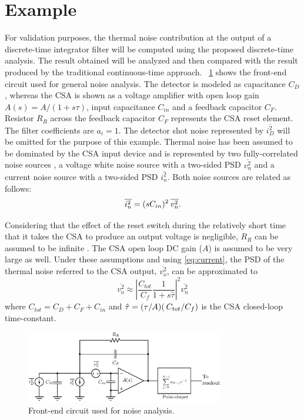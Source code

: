\section{Example}
For validation purposes, the thermal noise contribution at the output of a \mbox{discrete-time} integrator filter will be computed using the proposed \mbox{discrete-time} analysis. The result obtained will be analyzed and then compared with the result produced by the traditional \mbox{continuous-time} approach. \figurename~\ref{fig:analysis-circuit} shows the front-end circuit used for general noise analysis. The detector is modeled as capacitance $C_D$, whereas the CSA is shown as a voltage amplifier with open loop gain $A(s) = A/(1+s\tau)$, input capacitance $C_{in}$ and a feedback capacitor $C_F$. Resistor $R_R$ across the feedback capacitor $C_F$ represents the CSA reset element. The filter coefficients are $a_i=1$. The detector shot noise represented by $\overline{i^2_D}$ will be omitted for the purpose of this example. Thermal noise has been assumed to be dominated by the CSA input device and is represented by two \mbox{fully-correlated} noise sources \citep{sansen101}, a voltage white noise source with a \mbox{two-sided} PSD $\overline{v_n^2}$ and a current noise source with a \mbox{two-sided} PSD $\overline{i_n^2}$. Both noise sources are related as follows:
\begin{equation} 
\overline{i_n^2} = (sC_{in})^2 \hspace{0.2em}\overline{v_n^2}\label{eq:current}.
\end{equation}

Considering that the effect of the reset switch during the relatively short time that it takes the CSA to produce an output voltage is negligible, $R_R$ can be assumed to be infinite \citep{pullia102}. The CSA open loop DC gain ($A$) is assumed to be very large as well. Under these assumptions and using \eqref{eq:current}, the PSD of the thermal noise referred to the CSA output, $\overline{v_o^2}$, can be approximated to
\begin{equation} 
	\overline{v_o^2} \approx \left|\frac{C_{tot}}{C_f} \frac{1}{1+s\hat{\tau}}\right|^2\overline{v_n^2} \label{eq:ex-PSD}
\end{equation}
where $C_{tot} = C_D+C_F+C_{in}$ and $\hat{\tau} = (\tau/A) (\hspace{0.2em}C_{tot}/C_f)$ is the CSA \mbox{closed-loop} \mbox{time-constant}.

\begin{figure}[!t]
	\centering
	\includegraphics[width=3.4in]{./Figures/front-end.eps}
	\caption{Front-end circuit used for noise analysis.}\label{fig:analysis-circuit}
\end{figure}

